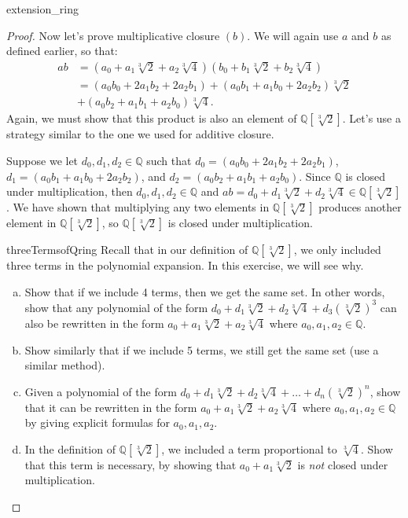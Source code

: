 \begin{example}{extension_ring}
\begin{proof}
Now let's prove multiplicative closure $(b)$.
We will again use $a$ and $b$ as defined earlier, so that: 
\begin{align*}
ab&=(a_0+a_1\sqrt[3]{2}+a_2\sqrt[3]{4})(b_0+b_1\sqrt[3]{2}+b_2\sqrt[3]{4})\\ &=(a_0b_0+2a_1b_2+2a_2b_1)+(a_0b_1+a_1b_0+2a_2b_2)\sqrt[3]{2}\\
& +(a_0b_2+a_1b_1+a_2b_0)\sqrt[3]{4}.
\end{align*}
Again, we must show that this product is also an element of ${\mathbb Q}[\sqrt[3]{2}]$.  Let's use a strategy similar to the one we used for additive closure.

Suppose we let $d_0,d_1,d_2\in{\mathbb Q}$ such that $d_0=(a_0b_0+2a_1b_2+2a_2b_1)$, $d_1=(a_0b_1+a_1b_0+2a_2b_2)$, and $d_2=(a_0b_2+a_1b_1+a_2b_0)$.  Since ${\mathbb Q}$ is closed under multiplication, then $d_0,d_1,d_2\in{\mathbb Q}$ and $ab=d_0+d_1\sqrt[3]{2}+d_2\sqrt[3]{4}\in{\mathbb Q}[\sqrt[3]{2}]$. We have shown that multiplying any two elements in ${\mathbb Q}[\sqrt[3]{2}]$ produces another element in ${\mathbb Q}[\sqrt[3]{2}]$, so ${\mathbb Q}[\sqrt[3]{2}]$ is closed under multiplication.\\

\begin{exercise}{threeTermsofQring}
Recall that in our definition of ${\mathbb Q}[\sqrt[3]{2}]$, we only included three terms in the polynomial expansion. In this exercise, we will see why. 
\begin{enumerate}[(a)]
\item Show that if we include 4 terms, then we get the same set. In other words, show that any polynomial of the form $d_0+d_1\sqrt[3]{2}+d_2\sqrt[3]{4}+d_3(\sqrt[3]{2})^3$ can also be rewritten in the form $a_0+a_1\sqrt[3]{2}+a_2\sqrt[3]{4}$ where $a_0, a_1, a_2  \in {\mathbb Q}$.
\item
Show similarly that if we include 5 terms, we still get the same set (use a similar method).
\item
Given a polynomial of the form $d_0+d_1\sqrt[3]{2}+d_2\sqrt[3]{4}+ \ldots + d_n(\sqrt[3]{2})^n$, show that it can be rewritten in the form $a_0+a_1\sqrt[3]{2}+a_2\sqrt[3]{4}$ where $a_0, a_1, a_2  \in {\mathbb Q}$ by giving explicit formulas for $a_0, a_1, a_2$.
\item
In the definition of ${\mathbb Q}[\sqrt[3]{2}]$, we included a term proportional to $\sqrt[3]{4}$.  Show that this term is necessary, by showing that $a_0+a_1\sqrt[3]{2}$ is \emph{not} closed under multiplication.
\end{enumerate}
\end{exercise}


\end{proof}
\end{example}
